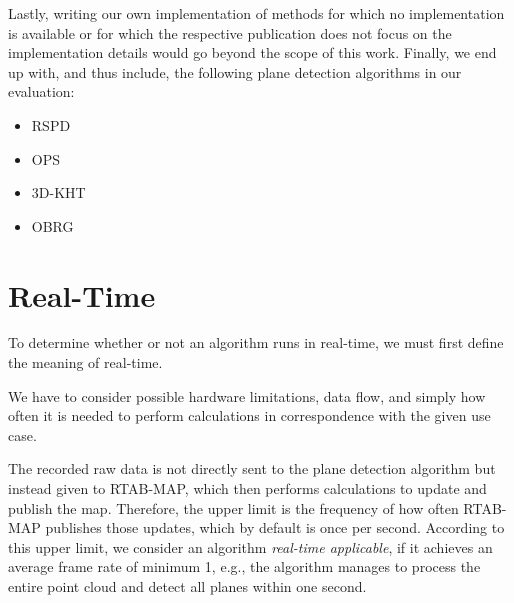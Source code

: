 \documentclass[main.tex]{subfiles}
\begin{document}
Lastly, writing our own implementation of methods for which no implementation is available or for which the respective publication does not focus on the implementation details would go beyond the scope of this work.
Finally, we end up with, and thus include, the following plane detection algorithms in our evaluation:

\begin{itemize}
    \item RSPD
    \item OPS
    \item 3D-KHT
    \item OBRG
\end{itemize}


\section{Real-Time}\label{sec:realtime}
To determine whether or not an algorithm runs in real-time, we must first define the meaning of real-time.

We have to consider possible hardware limitations, data flow, and simply
how often it is needed to perform calculations in correspondence with the given use case.

The recorded raw data is not directly sent to the plane detection algorithm but instead given to RTAB-MAP, which then performs
calculations to update and publish the map.
Therefore, the upper limit is the frequency of how often RTAB-MAP publishes those updates, which by default is once per second.
According to this upper limit, we consider an algorithm \textit{real-time applicable}, if it achieves an average frame
rate of minimum 1, e.g., the algorithm manages to process the entire point cloud and detect all planes within one second.

\end{document}
